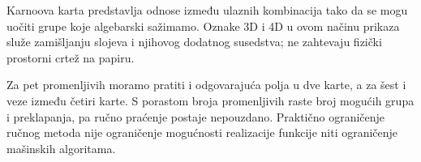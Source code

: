 
Karnoova karta predstavlja odnose između ulaznih kombinacija tako da se mogu uočiti grupe koje algebarski sažimamo. Oznake 3D i 4D u ovom načinu prikaza služe zamišljanju slojeva i njihovog dodatnog susedstva; ne zahtevaju fizički prostorni crtež na papiru.

Za pet promenljivih moramo pratiti i odgovarajuća polja u dve karte, a za šest i veze između četiri karte. S porastom broja promenljivih raste broj mogućih grupa i preklapanja, pa ručno praćenje postaje nepouzdano. Praktično ograničenje ručnog metoda nije ograničenje mogućnosti realizacije funkcije niti ograničenje mašinskih algoritama.
